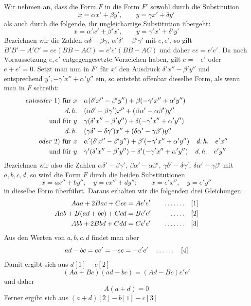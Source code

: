 Wir nehmen an, dass die Form $F$ in die Form $F'$ sowohl durch die Substitution
\[
x=\alpha x'+\beta y',\qquad y=\gamma x'+\delta y'
\]
als auch durch die folgende, ihr ungleichartige Substitution übergeht:
\[
x=\alpha'x'+\beta'x',\qquad y=\gamma'x'+\delta'y'
\]
Bezeichnen wir die Zahlen $\alpha\delta-\beta\gamma,\ \alpha'\delta'-\beta'\gamma'$ mit $e,e'$, so gilt $B'B'-A'C'=ee(BB-AC)=e'e'(BB-AC)$ und daher $ee=e'e'$. Da nach Voraussetzung $e,e'$ entgegengesetzte Vorzeichen haben, gilt $e=-e'$ oder $e+e'=0$. Setzt man nun in $F'$ für $x'$ den Ausdruck $\delta'x''-\beta'y''$ und entsprechend $y',-\gamma'x''+\alpha'y''$ ein, so entsteht offenbar dieselbe Form, als wenn man in $F$ schreibt:
\[
\begin{aligned}
\text{\textit{entweder} 1) für }x\quad&\alpha(\delta'x''-\beta'y'')+\beta(-\gamma'x''+\alpha'y'')\\
\text{\textit{d.\,h.}}\quad&(\alpha\delta'-\beta\gamma')x''+(\beta\alpha'-\alpha\beta')y''\\
\text{und für }y\quad&\gamma(\delta'x''-\beta'y'')+\delta(-\gamma'x''+\alpha'y'')\\
\text{\textit{d.\,h.}}\quad&(\gamma\delta'-\delta\gamma')x''+(\delta\alpha'-\gamma\beta')y''\\
\text{\textit{oder} 2) für }x\quad&\alpha'(\delta'x''-\beta'y'')+\beta'(-\gamma'x''+\alpha'y'')\quad\text{\textit{d.\,h.}}\quad e'x''\\
\text{und für }y\quad&\gamma'(\delta'x''-\beta'y'')+\delta'(-\gamma'x''+\alpha'y'')\quad\text{\textit{d.\,h.}}\quad e'y''
\end{aligned}
\]
Bezeichnen wir also die Zahlen $\alpha\delta'-\beta\gamma',\ \beta\alpha'-\alpha\beta',\ \gamma\delta'-\delta\gamma',\ \delta\alpha'-\gamma\beta'$ mit $a,b,c,d$, so wird die Form $F$ durch die beiden Substitutionen
\[
x=ax''+by'',\quad y=cx''+dy'';\qquad x=e'x'',\quad y=e'y''
\]
in dieselbe Form überführt. Daraus erhalten wir die folgenden drei Gleichungen:
\[
\begin{aligned}
Aaa+2Bac+Ccc&=Ae'e'&\quad\mathinner{.\,.\,.\,.\,.\,.\,.}\quad&[1]\\
Aab+B(ad+bc)+Ccd&=Be'e'&\quad\mathinner{.\,.\,.\,.\,.}\quad&[2]\\
Abb+2Bbd+Cdd&=Ce'e'&\quad\mathinner{.\,.\,.\,.\,.\,.\,.}\quad&[3]
\end{aligned}
\]
Aus den Werten von $a,b,c,d$ findet man aber
\[
ad-bc=ee'=-ee=-e'e'\quad\mathinner{.\,.\,.\,.\,.\,.}\quad[4]
\]
Damit ergibt sich aus $d[1]-c[2]$
\[
(Aa+Bc)(ad-bc)=(Ad-Bc)e'e'
\]
und daher
\[
A(a+d)=0
\]
Ferner ergibt sich aus $(a+d)[2]-b[1]-c[3]$

